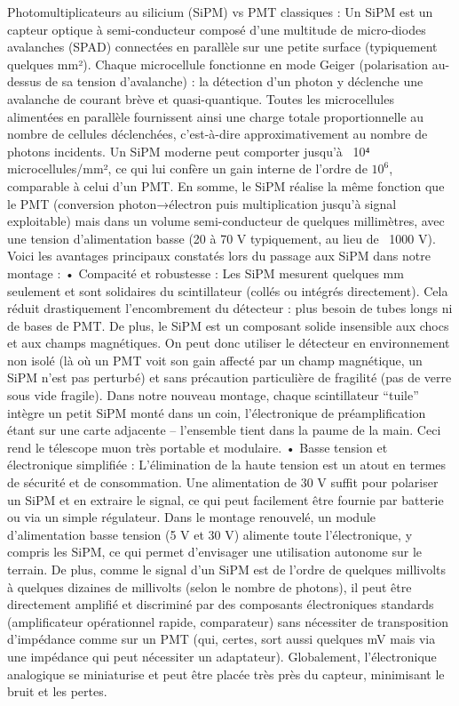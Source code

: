 \documentclass[a4paper,12pt,twoside]{article}
\begin{document}
Photomultiplicateurs au silicium (SiPM) vs PMT classiques : Un SiPM est un capteur optique à semi-conducteur composé d’une multitude de micro-diodes avalanches (SPAD) connectées en parallèle sur une petite surface (typiquement quelques mm²). Chaque microcellule fonctionne en mode Geiger (polarisation au-dessus de sa tension d’avalanche) : la détection d’un photon y déclenche une avalanche de courant brève et quasi-quantique. Toutes les microcellules alimentées en parallèle fournissent ainsi une charge totale proportionnelle au nombre de cellules déclenchées, c’est-à-dire approximativement au nombre de photons incidents. Un SiPM moderne peut comporter jusqu’à ~10⁴ microcellules/mm², ce qui lui confère un gain interne de l’ordre de $10^6$, comparable à celui d’un PMT. En somme, le SiPM réalise la même fonction que le PMT (conversion photon→électron puis multiplication jusqu’à signal exploitable) mais dans un volume semi-conducteur de quelques millimètres, avec une tension d’alimentation basse (20 à 70 V typiquement, au lieu de ~1000 V). Voici les avantages principaux constatés lors du passage aux SiPM dans notre montage :
	•	Compacité et robustesse : Les SiPM mesurent quelques mm seulement et sont solidaires du scintillateur (collés ou intégrés directement). Cela réduit drastiquement l’encombrement du détecteur : plus besoin de tubes longs ni de bases de PMT. De plus, le SiPM est un composant solide insensible aux chocs et aux champs magnétiques. On peut donc utiliser le détecteur en environnement non isolé (là où un PMT voit son gain affecté par un champ magnétique, un SiPM n’est pas perturbé) et sans précaution particulière de fragilité (pas de verre sous vide fragile). Dans notre nouveau montage, chaque scintillateur “tuile” intègre un petit SiPM monté dans un coin, l’électronique de préamplification étant sur une carte adjacente – l’ensemble tient dans la paume de la main. Ceci rend le télescope muon très portable et modulaire.
	•	Basse tension et électronique simplifiée : L’élimination de la haute tension est un atout en termes de sécurité et de consommation. Une alimentation de 30 V suffit pour polariser un SiPM et en extraire le signal, ce qui peut facilement être fournie par batterie ou via un simple régulateur. Dans le montage renouvelé, un module d’alimentation basse tension (5 V et 30 V) alimente toute l’électronique, y compris les SiPM, ce qui permet d’envisager une utilisation autonome sur le terrain. De plus, comme le signal d’un SiPM est de l’ordre de quelques millivolts à quelques dizaines de millivolts (selon le nombre de photons), il peut être directement amplifié et discriminé par des composants électroniques standards (amplificateur opérationnel rapide, comparateur) sans nécessiter de transposition d’impédance comme sur un PMT (qui, certes, sort aussi quelques mV mais via une impédance qui peut nécessiter un adaptateur). Globalement, l’électronique analogique se miniaturise et peut être placée très près du capteur, minimisant le bruit et les pertes.
\end{document}
